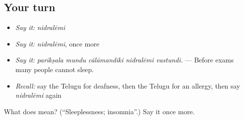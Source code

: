 \subsection*{Your turn}
\begin{itemize}
\raggedright
  \item \emph{Say it:} \emph{nidralēmi}
  \item \emph{Say it:} \emph{nidralēmi}, once more
  \item \emph{Say it:} \emph{parīkṣala mundu cālāmandiki nidralēmi vastundi.} — Before exams many people cannot sleep.
  \item \emph{Recall:} say the Telugu for deafness, then the Telugu for an allergy, then say \emph{nidralēmi} again
\end{itemize}

\begin{tcolorbox}[breakable,colback=teal!4,colframe=teal!35!black,title={Before you move on}]
What does  mean? (\textquotedblleft{}Sleeplessness; insomnia\textquotedblright{}.) Say it once more.
\end{tcolorbox}
